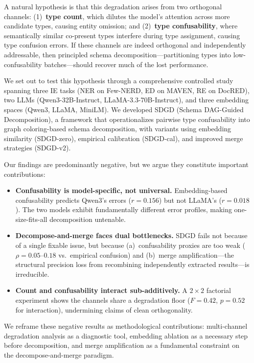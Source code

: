 \documentclass[11pt,a4paper]{article}
\begin{document}
A natural hypothesis is that this degradation arises from two orthogonal channels: (1)~\textbf{type count}, which dilutes the model's attention across more candidate types, causing entity omission; and (2)~\textbf{type confusability}, where semantically similar co-present types interfere during type assignment, causing type confusion errors. If these channels are indeed orthogonal and independently addressable, then principled schema decomposition---partitioning types into low-confusability batches---should recover much of the lost performance.

We set out to test this hypothesis through a comprehensive controlled study spanning three IE tasks (NER on Few-NERD, ED on MAVEN, RE on DocRED), two LLMs (Qwen3-32B-Instruct, LLaMA-3.3-70B-Instruct), and three embedding spaces (Qwen3, LLaMA, MiniLM). We developed SDGD (Schema DAG-Guided Decomposition), a framework that operationalizes pairwise type confusability into graph coloring-based schema decomposition, with variants using embedding similarity (SDGD-zero), empirical calibration (SDGD-cal), and improved merge strategies (SDGD-v2).

Our findings are predominantly negative, but we argue they constitute important contributions:

\begin{itemize}
\item \textbf{Confusability is model-specific, not universal.} Embedding-based confusability predicts Qwen3's errors ($r{=}0.156$) but not LLaMA's ($r{=}0.018$). The two models exhibit fundamentally different error profiles, making one-size-fits-all decomposition untenable.

\item \textbf{Decompose-and-merge faces dual bottlenecks.} SDGD fails not because of a single fixable issue, but because (a)~confusability proxies are too weak ($\rho{=}0.05$--$0.18$ vs.\ empirical confusion) and (b)~merge amplification---the structural precision loss from recombining independently extracted results---is irreducible.

\item \textbf{Count and confusability interact sub-additively.} A $2{\times}2$ factorial experiment shows the channels share a degradation floor ($F{=}0.42$, $p{=}0.52$ for interaction), undermining claims of clean orthogonality.
\end{itemize}

We reframe these negative results as methodological contributions: multi-channel degradation analysis as a diagnostic tool, embedding ablation as a necessary step before decomposition, and merge amplification as a fundamental constraint on the decompose-and-merge paradigm.
\end{document}

